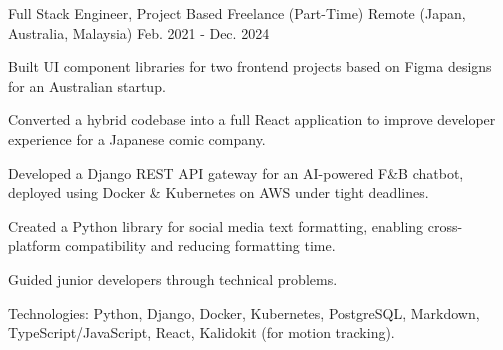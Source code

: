 

\begin{cventries}


  \cventry
    {Full Stack Engineer, Project Based} %
    {Freelance (Part-Time)} %
    {Remote (Japan, Australia, Malaysia)} %
    {Feb. 2021 - Dec. 2024} %
    {
      \begin{cvitems} %
        \item {Built UI component libraries for two frontend projects based on Figma designs for an Australian startup.}
        \item {Converted a hybrid codebase into a full React application to improve developer experience for a Japanese comic company.}
        \item {Developed a Django REST API gateway for an AI-powered F\&B chatbot, deployed using Docker \& Kubernetes on AWS under tight deadlines.}
        \item {Created a Python library for social media text formatting, enabling cross-platform compatibility and reducing formatting time.}
        \item {Guided junior developers through technical problems.}
        \item {Technologies: Python, Django, Docker, Kubernetes, PostgreSQL, Markdown, TypeScript/JavaScript, React, Kalidokit (for motion tracking).}
      \end{cvitems}
    }


\end{cventries}
